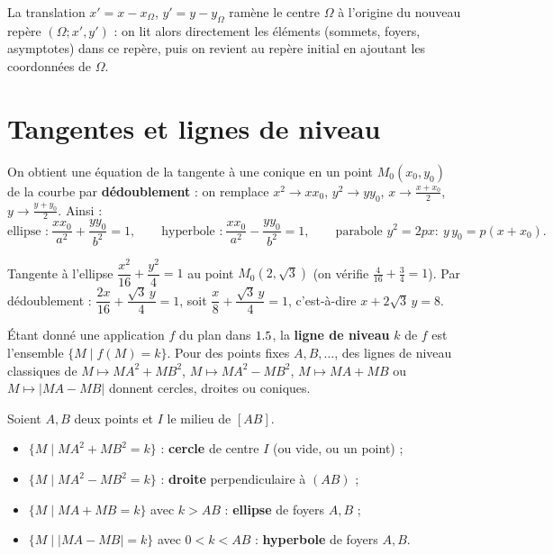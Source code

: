 \begin{remarque}
La translation $x'=x-x_\Omega$, $y'=y-y_\Omega$ ramène le centre $\Omega$ à l'origine du
nouveau repère $(\Omega;x',y')$ : on lit alors directement les éléments (sommets, foyers,
asymptotes) dans ce repère, puis on revient au repère initial en ajoutant les coordonnées
de $\Omega$.
\end{remarque}

\section{Tangentes et lignes de niveau}

\begin{propriete}
On obtient une équation de la tangente à une conique en un point $M_0(x_0,y_0)$ de la
courbe par \textbf{dédoublement} : on remplace $x^{2}\to x x_0$, $y^{2}\to y y_0$,
$x\to\tfrac{x+x_0}2$, $y\to\tfrac{y+y_0}2$. Ainsi :
\[
\text{ellipse :}\ \frac{x x_0}{a^{2}}+\frac{y y_0}{b^{2}}=1,\qquad
\text{hyperbole :}\ \frac{x x_0}{a^{2}}-\frac{y y_0}{b^{2}}=1,\qquad
\text{parabole }y^{2}=2px:\ y\,y_0=p(x+x_0).
\]
\end{propriete}

\begin{exemple}
Tangente à l'ellipse $\dfrac{x^{2}}{16}+\dfrac{y^{2}}{4}=1$ au point $M_0\!\left(2,\sqrt3\right)$
(on vérifie $\tfrac{4}{16}+\tfrac34=1$). Par dédoublement :
$\dfrac{2x}{16}+\dfrac{\sqrt3\,y}{4}=1$, soit $\dfrac x8+\dfrac{\sqrt3\,y}4=1$, c'est-à-dire
$x+2\sqrt3\,y=8$.
\end{exemple}

\begin{definition}
Étant donné une application $f$ du plan dans $1.5$, la \textbf{ligne de niveau} $k$ de $f$
est l'ensemble $\{M\mid f(M)=k\}$. Pour des points fixes $A,B,\dots$, des lignes de niveau
classiques de $M\mapsto MA^{2}+MB^{2}$, $M\mapsto MA^{2}-MB^{2}$, $M\mapsto MA+MB$ ou
$M\mapsto |MA-MB|$ donnent cercles, droites ou coniques.
\end{definition}

\begin{propriete}
Soient $A,B$ deux points et $I$ le milieu de $[AB]$.
\begin{itemize}
\item $\{M\mid MA^{2}+MB^{2}=k\}$ : \textbf{cercle} de centre $I$ (ou vide, ou un point) ;
\item $\{M\mid MA^{2}-MB^{2}=k\}$ : \textbf{droite} perpendiculaire à $(AB)$ ;
\item $\{M\mid MA+MB=k\}$ avec $k>AB$ : \textbf{ellipse} de foyers $A,B$ ;
\item $\{M\mid |MA-MB|=k\}$ avec $0<k<AB$ : \textbf{hyperbole} de foyers $A,B$.
\end{itemize}
\end{propriete}

